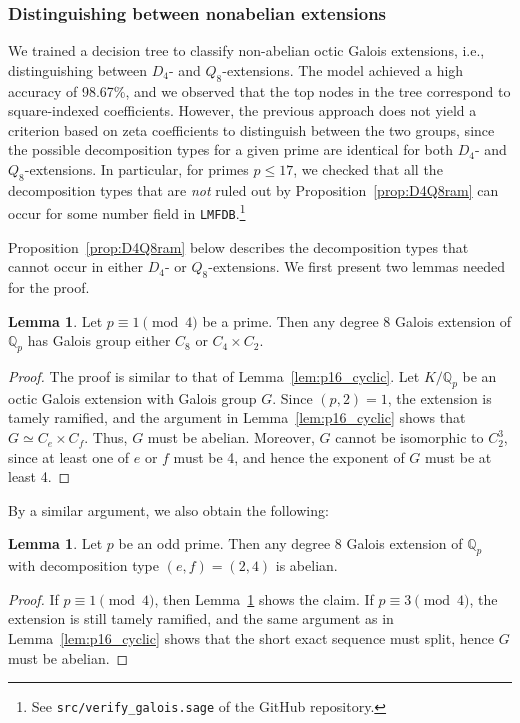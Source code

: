 \documentclass[letterpaper, 10pt]{article}
\newcommand{\bQ}{\mathbb{Q}}
\newcommand{\1}{\mathds{1}}	%
\theoremstyle{definition}
\newtheorem{lemma}[theorem]{Lemma}
\theoremstyle{remark}
\begin{document}
\subsubsection{Distinguishing between nonabelian extensions}
\label{subsubsec:octic_nab}


We trained a decision tree to classify non-abelian octic Galois extensions, i.e., distinguishing between \( D_4 \)- and \( Q_8 \)-extensions. The model achieved a high accuracy of  98.67\%, and we observed that the top nodes in the tree correspond to square-indexed coefficients.  However, the previous approach does not yield a criterion based on zeta coefficients to distinguish between the two groups, since the possible decomposition types for a given prime are identical for both \( D_4 \)- and \( Q_8 \)-extensions.
 In particular, for primes $p \le 17$, we checked that all the decomposition types that are \emph{not} ruled out by Proposition~\ref{prop:D4Q8ram} can occur for some number field in \texttt{LMFDB}.\footnote{See \texttt{src/verify\_galois.sage} of the GitHub repository.}

Proposition~\ref{prop:D4Q8ram} below describes the decomposition types that cannot occur in either \( D_4 \)- or \( Q_8 \)-extensions. We first present two lemmas needed for the proof.

\begin{lemma}
    \label{lem:octic_p14_ab}
    Let \( p \equiv 1 \pmod{4} \) be a prime. Then any degree 8 Galois extension of \( \bQ_p \) has Galois group either \( C_8 \) or \( C_4 \times C_2 \).
\end{lemma}
\begin{proof}
    The proof is similar to that of Lemma~\ref{lem:p16_cyclic}.  
Let \( K / \bQ_p \) be an octic Galois extension with Galois group \( G \).  
Since \( (p, 2) = 1 \), the extension is tamely ramified, and the argument in Lemma~\ref{lem:p16_cyclic} shows that \( G \simeq C_e \times C_f \).  
Thus, \( G \) must be abelian. Moreover, \( G \) cannot be isomorphic to \( C_2^3 \), since at least one of \( e \) or \( f \) must be 4, and hence the exponent of \( G \) must be at least 4.
\end{proof}

By a similar argument, we also obtain the following:
\begin{lemma}
    \label{lem:octic_p12_ab}
    Let \( p \) be an odd prime. Then any degree \( 8 \) Galois extension of \( \mathbb{Q}_p \) with decomposition type \( (e, f) = (2, 4) \) is abelian.
\end{lemma}
\begin{proof}
    If \( p \equiv 1 \pmod{4} \), then Lemma~\ref{lem:octic_p14_ab} shows the claim.  
If \( p \equiv 3 \pmod{4} \), the extension is still tamely ramified, and the same argument as in Lemma~\ref{lem:p16_cyclic} shows that the short exact sequence must split, hence \( G \) must be abelian.
\end{proof}
\end{document}
